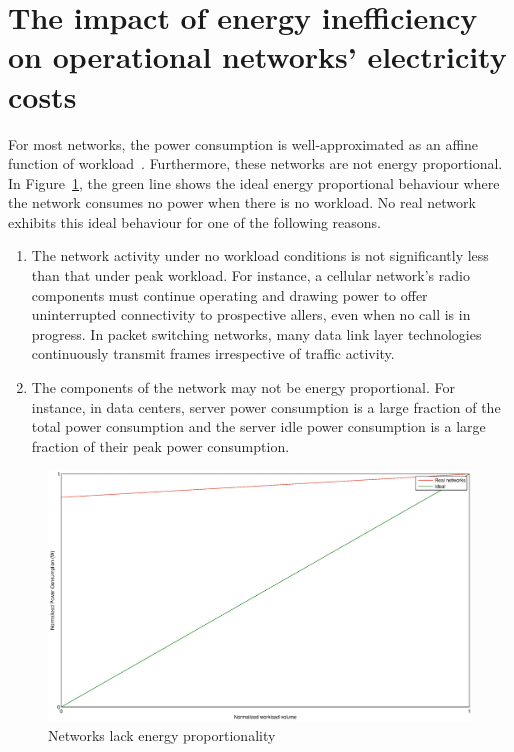 \section{The impact of energy inefficiency on operational networks' electricity costs} 

For most networks, the power consumption is well-approximated as an affine function of workload~\cite{Peng:2011:TPS:2030613.2030628,Fan:power:ICSA:2007}. Furthermore, these networks are not energy proportional. In Figure~\ref{fig:ener-prop}, the green line shows the ideal energy proportional behaviour where the network consumes no power when there is no workload. No real network exhibits this ideal behaviour for one of the following reasons. 
\begin{enumerate}
\item The network activity under no workload conditions is not significantly less than that under peak workload. For instance, a cellular network's radio components must continue operating and drawing power to offer uninterrupted connectivity to prospective allers, even when no call is in progress. In packet switching networks, many data link layer technologies continuously transmit frames irrespective of traffic activity. 
\item The components of the network may not be energy proportional. For instance, in data centers, server power consumption is a large fraction of the total power consumption and the server idle power consumption is a large fraction of their peak power consumption. 
\end{enumerate}

\begin{figure}
\includegraphics[width=1\textwidth]{pics/enerprop.eps}
\caption{Networks lack energy proportionality}
\label{fig:ener-prop}
\end{figure} 

